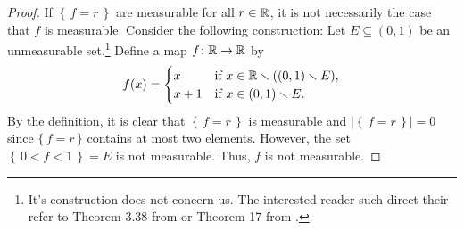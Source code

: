 \begin{proof}
If $\left\{\,f=r\,\right\}$ are measurable for all $r\in\mathbb{R}$, it is not
necessarily the case that $f$ is measurable. Consider the following
construction: Let $E\subseteq(0,1)$ be an unmeasurable set.\footnote{It's
  construction does not concern us. The interested reader such direct their
  refer to Theorem 3.38 from \cite[Ch.\@ 3, p.\@ 57-58]{wheeden-zygmund} or
  Theorem 17 from \cite[Ch.\@ 2\S 7, p.\@ 48]{royden}.} Define a map
$f\colon\mathbb{R}\to\mathbb{R}$ by
\begin{equation}
\label{eq:prep:1:11}
f(x)=
\begin{cases}
x&\text{if $x\in\mathbb{R}\smallsetminus((0,1)\smallsetminus E)$},\\
x+1&\text{if $x\in (0,1)\smallsetminus E$.}
\end{cases}
\end{equation}
By the definition, it is clear that $\left\{\,f=r\,\right\}$ is measurable
and $\left|\left\{\,f=r\,\right\}\right|=0$ since $\{\,f=r\,\}$ contains at
most two elements. However, the set $\left\{\,0<f<1\,\right\}=E$ is not
measurable. Thus, $f$ is not measurable.
\end{proof}

